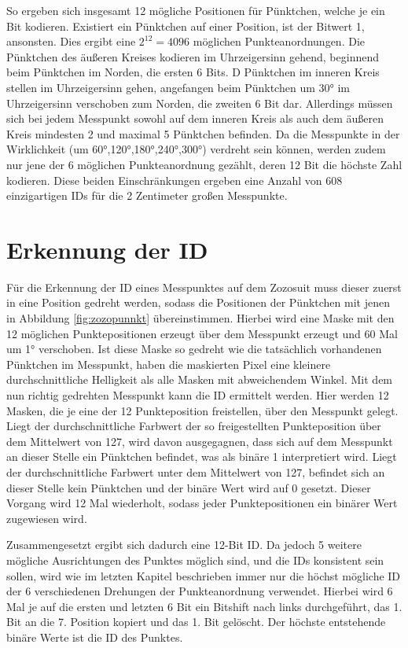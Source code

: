 So ergeben sich insgesamt 12 mögliche Positionen für Pünktchen, welche je ein Bit kodieren. Existiert ein Pünktchen auf einer Position,
ist der Bitwert 1, ansonsten. Dies ergibt eine $2^12=4096$ möglichen Punkteanordnungen. Die Pünktchen des äußeren Kreises kodieren im
Uhrzeigersinn gehend, beginnend beim Pünktchen im Norden, die ersten 6 Bits. D Pünktchen im inneren Kreis stellen im Uhrzeigersinn gehen, angefangen
beim Pünktchen um 30° im Uhrzeigersinn verschoben zum Norden, die zweiten 6 Bit dar. Allerdings müssen sich bei jedem Messpunkt 
sowohl auf dem inneren Kreis als auch dem 
äußeren Kreis mindesten 2 und maximal 5 Pünktchen befinden. Da die Messpunkte in der Wirklichkeit (um 60°,120°,180°,240°,300°) verdreht sein können, werden zudem nur jene der
6 möglichen Punkteanordnung gezählt, deren 12 Bit die höchste Zahl kodieren. Diese beiden Einschränkungen ergeben eine Anzahl von 608 einzigartigen
IDs für die 2 Zentimeter großen Messpunkte. \cite{Pina:2018}

\section{Erkennung der ID}

Für die Erkennung der ID eines Messpunktes auf dem Zozosuit muss dieser zuerst in eine Position gedreht werden, sodass die Positionen
der Pünktchen mit jenen in Abbildung \ref{fig:zozopunnkt} übereinstimmen. Hierbei wird eine Maske mit den 12 möglichen Punktepositionen
erzeugt über dem Messpunkt erzeugt und 60 Mal um 1° verschoben. Ist diese Maske so gedreht wie die tatsächlich vorhandenen Pünktchen 
im Messpunkt, haben die maskierten Pixel eine kleinere durchschnittliche Helligkeit als alle Masken mit abweichendem Winkel. 
Mit dem nun richtig gedrehten Messpunkt kann die ID ermittelt werden. Hier werden 12 Masken, die je eine der 12 Punkteposition freistellen,
über den Messpunkt gelegt. Liegt der durchschnittliche Farbwert der so freigestellten Punkteposition über dem Mittelwert von 127, wird davon ausgegagnen,
dass sich auf dem Messpunkt an dieser Stelle ein Pünktchen befindet, was als binäre 1 interpretiert wird. Liegt der durchschnittliche Farbwert
unter dem Mittelwert von 127, befindet sich an dieser Stelle kein Pünktchen und der binäre Wert wird auf 0 gesetzt. Dieser Vorgang wird 12 Mal wiederholt,
sodass jeder Punktepositionen ein binärer Wert zugewiesen wird. \cite{Pina:2018}

Zusammengesetzt ergibt sich dadurch eine 12-Bit ID. Da jedoch 5 weitere mögliche Ausrichtungen des Punktes möglich sind, und die IDs 
konsistent sein sollen, wird wie im letzten Kapitel beschrieben immer nur die höchst mögliche ID der 6 verschiedenen Drehungen der Punkteanordnung
verwendet. Hierbei wird 6 Mal je auf die ersten und letzten 6 Bit ein Bitshift nach links durchgeführt, das 1. Bit an die 7. Position kopiert
und das 1. Bit gelöscht. Der höchste entstehende binäre Werte ist die ID des Punktes. \cite{Pina:2018}